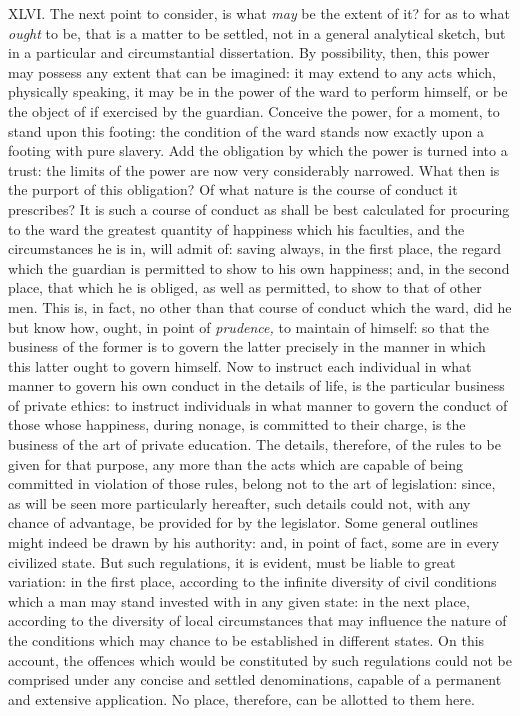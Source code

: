 \documentclass[12pt]{report}
\begin{document}
XLVI. The next point to consider, is what \emph{may} be the extent of
it? for as to what \emph{ought} to be, that is a matter to be settled,
not in a general analytical sketch, but in a particular and
circumstantial dissertation. By possibility, then, this power may
possess any extent that can be imagined: it may extend to any acts
which, physically speaking, it may be in the power of the ward to
perform himself, or be the object of if exercised by the guardian.
Conceive the power, for a moment, to stand upon this footing: the
condition of the ward stands now exactly upon a footing with pure
slavery. Add the obligation by which the power is turned into a trust:
the limits of the power are now very considerably narrowed. What then is
the purport of this obligation? Of what nature is the course of conduct
it prescribes? It is such a course of conduct as shall be best
calculated for procuring to the ward the greatest quantity of happiness
which his faculties, and the circumstances he is in, will admit of:
saving always, in the first place, the regard which the guardian is
permitted to show to his own happiness; and, in the second place, that
which he is obliged, as well as permitted, to show to that of other men.
This is, in fact, no other than that course of conduct which the ward,
did he but know how, ought, in point of \emph{prudence,} to maintain of
himself: so that the business of the former is to govern the latter
precisely in the manner in which this latter ought to govern himself.
Now to instruct each individual in what manner to govern his own conduct
in the details of life, is the particular business of private ethics: to
instruct individuals in what manner to govern the conduct of those whose
happiness, during nonage, is committed to their charge, is the business
of the art of private education. The details, therefore, of the rules to
be given for that purpose, any more than the acts which are capable of
being committed in violation of those rules, belong not to the art of
legislation: since, as will be seen more particularly hereafter, such
details could not, with any chance of advantage, be provided for by the
legislator. Some general outlines might indeed be drawn by his
authority: and, in point of fact, some are in every civilized state. But
such regulations, it is evident, must be liable to great variation: in
the first place, according to the infinite diversity of civil conditions
which a man may stand invested with in any given state: in the next
place, according to the diversity of local circumstances that may
influence the nature of the conditions which may chance to be
established in different states. On this account, the offences which
would be constituted by such regulations could not be comprised under
any concise and settled denominations, capable of a permanent and
extensive application. No place, therefore, can be allotted to them
here.
\end{document}
